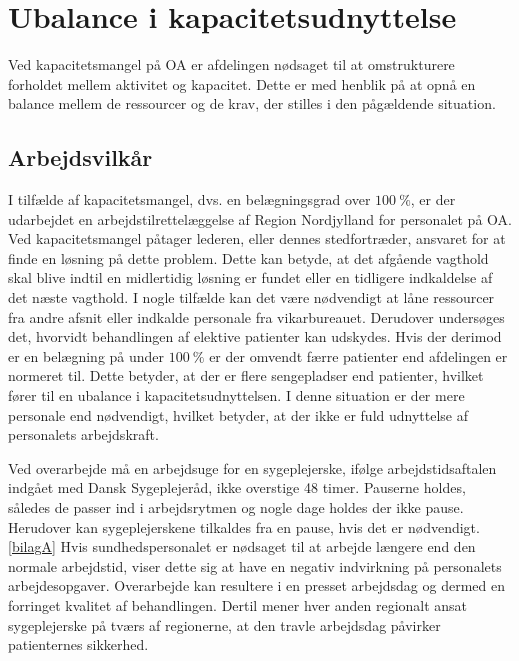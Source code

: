 \section{Ubalance i kapacitetsudnyttelse}
Ved kapacitetsmangel på OA er afdelingen nødsaget til at omstrukturere forholdet mellem aktivitet og kapacitet. Dette er med henblik på at opnå en balance mellem de ressourcer og de krav, der stilles i den pågældende situation.\cite{Bjerg2016} %

\subsection{Arbejdsvilkår} \label{Per_sik}

I tilfælde af kapacitetsmangel, dvs. en belægningsgrad over $100~\%$, er der udarbejdet en arbejdstilrettelæggelse af Region Nordjylland for personalet på OA. Ved kapacitetsmangel påtager lederen, eller dennes stedfortræder, ansvaret for at finde en løsning på dette problem. Dette kan betyde, at det afgående vagthold skal blive indtil en midlertidig løsning er fundet eller en tidligere indkaldelse af det næste vagthold. I nogle tilfælde kan det være nødvendigt at låne ressourcer fra andre afsnit eller indkalde personale fra vikarbureauet. Derudover undersøges det, hvorvidt behandlingen af elektive patienter kan udskydes.\cite{Bjerg2016} 
Hvis der derimod er en belægning på under $100~\%$ er der omvendt færre patienter end afdelingen er normeret til. Dette betyder, at der er flere sengepladser end patienter, hvilket fører til en ubalance i kapacitetsudnyttelsen. I denne situation er der mere personale end nødvendigt, hvilket betyder, at der ikke er fuld udnyttelse af personalets arbejdskraft. 

Ved overarbejde må en arbejdsuge for en sygeplejerske, ifølge arbejdstidsaftalen indgået med Dansk Sygeplejeråd, ikke overstige 48 timer\cite{Danske2015}. Pauserne holdes, således de passer ind i arbejdsrytmen og nogle dage holdes der ikke pause. Herudover kan sygeplejerskene tilkaldes fra en pause, hvis det er nødvendigt.\ref{bilagA} Hvis sundhedspersonalet er nødsaget til at arbejde længere end den normale arbejdstid, viser dette sig at have en negativ indvirkning på personalets arbejdesopgaver\cite{Dinges2004}. Overarbejde kan resultere i en presset arbejdsdag og dermed en forringet kvalitet af behandlingen\cite{Kjeldsen2015}. Dertil mener hver anden regionalt ansat sygeplejerske på tværs af regionerne, at den travle arbejdsdag påvirker patienternes sikkerhed\cite{Kjeldsen2015}.


